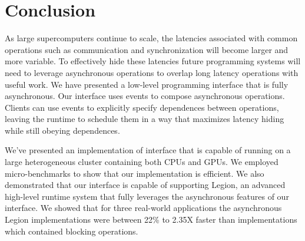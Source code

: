 
\section{Conclusion}
\label{sec:conclusion}

As large supercomputers continue to scale, the latencies associated
with common operations such as communication and synchronization will
become larger and more variable.  To effectively hide these latencies
future programming systems will need to leverage asynchronous operations
to overlap long latency operations with useful work.  We have
presented a low-level programming interface that is fully asynchronous.
Our interface uses events to compose asynchronous operations.  Clients
can use events to explicitly specify dependences between operations,
leaving the runtime to schedule them in a way that maximizes latency 
hiding while still obeying dependences.

We've presented an implementation of interface that is capable of running
on a large heterogeneous cluster containing both CPUs and GPUs.  We
employed micro-benchmarks to show that our implementation is efficient.
We also demonstrated that our interface is capable of supporting Legion,
an advanced high-level runtime system that fully leverages the asynchronous
features of our interface.  We showed that for three real-world applications
the asynchronous Legion implementations were between 22\% to 2.35X faster than
implementations which contained blocking operations.


